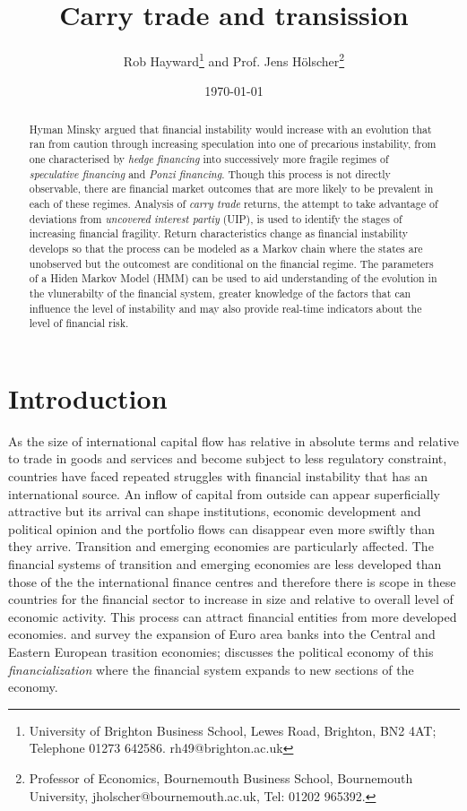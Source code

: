 \documentclass[12pt, a4paper, oneside]{article} %
\begin{document}
\title{Carry trade and transission}
\author{Rob Hayward\footnote{University of Brighton Business School, Lewes Road, Brighton, BN2 4AT; Telephone 01273 642586.  rh49@brighton.ac.uk} and Prof. Jens H\"{o}lscher\footnote{Professor of Economics, Bournemouth Business School, Bournemouth University, jholscher@bournemouth.ac.uk, Tel: 01202 965392.}} 
\date{\today}
\maketitle
\begin{abstract}
Hyman Minsky argued that financial instability would increase with an evolution that ran from caution through increasing speculation into one of precarious instability, from one characterised by \emph{hedge financing} into successively more fragile regimes of \emph{speculative financing} and \emph{Ponzi financing}.  Though this process is not directly observable, there are financial market outcomes that are more likely to be prevalent in each of these regimes.  Analysis of \emph{carry trade} returns, the attempt to take advantage of deviations from \emph{uncovered interest partiy} (UIP), is used to identify the stages of increasing financial fragility.  Return characteristics change as financial instability develops so that the process can be modeled as a Markov chain where the states are unobserved but the outcomest are conditional on  the financial regime.  The parameters of a Hiden Markov Model (HMM) can be used to aid understanding of the evolution in the vlunerabilty of the financial system, greater knowledge of the factors that can influence the level of instability and may also provide real-time indicators about the level of financial risk. 

\end{abstract}

\section{Introduction}
As the size of international capital flow has relative in absolute terms and relative to trade in goods and services and become subject to less regulatory constraint, countries have faced repeated struggles with financial instability that has an international source.  An inflow of capital from outside can appear superficially attractive but its arrival can shape institutions, economic development and political opinion and the portfolio flows can disappear even more swiftly than they arrive.  Transition and emerging economies are particularly affected.  The financial systems of transition and emerging economies are less developed than those of the the international finance centres and therefore there is scope in these countries for the financial sector to increase in size and relative to overall level of economic activity.  This process can attract financial entities from more developed economies. \citet{ONBcarry} and \citet{EBRD} survey the expansion of Euro area banks into the Central and Eastern European trasition economies; \citet{Gabor} discusses the political economy of this \emph{financialization} where the financial system expands to new sections of the economy.  
\end{document}
